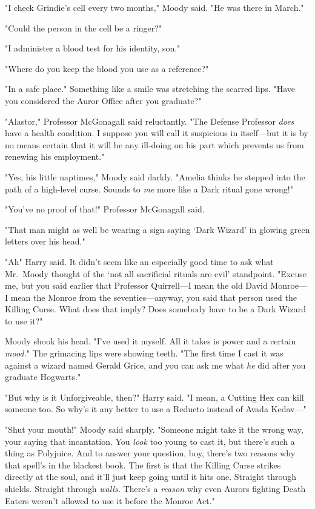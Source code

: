 "I check Grindie's cell every two months," Moody said. "He was there in March."

"Could the person in the cell be a ringer?"

"I administer a blood test for his identity, son."

"Where do you keep the blood you use as a reference?"

"In a safe place." Something like a smile was stretching the scarred lips.
"Have you considered the Auror Office after you graduate?"

"Alastor," Professor McGonagall said reluctantly. "The Defense Professor
\emph{does} have a{\el} health condition. I suppose you will call it
suspicious in itself---but it is by no means certain that it will be any
ill-doing on his part which prevents us from renewing his employment."

"Yes, his little naptimes," Moody said darkly. "Amelia thinks he stepped into
the path of a high-level curse. Sounds to \emph{me} more like a Dark ritual
gone wrong!"

"You've no proof of that!" Professor McGonagall said.

"That man might as well be wearing a sign saying `Dark Wizard' in glowing green
letters over his head."

"Ah{\el}" Harry said. It didn't seem like an especially good time to ask
what Mr.~Moody thought of the `not all sacrificial rituals are evil'
standpoint. "Excuse me, but you said earlier that Professor Quirrell---I mean
the old David Monroe---I mean the Monroe from the seventies---anyway, you said
that person used the Killing Curse. What does that imply? Does somebody have to
be a Dark Wizard to use it?"

Moody shook his head. "I've used it myself. All it takes is power and a certain
\emph{mood.}" The grimacing lips were showing teeth. "The first time I cast it
was against a wizard named Gerald Grice, and you can ask me what \emph{he} did
after you graduate Hogwarts."

"But why is it Unforgiveable, then?" Harry said. "I mean, a Cutting Hex can
kill someone too. So why's it any better to use a Reducto instead of Avada
Kedav---"

"Shut your mouth!" Moody said sharply. "Someone might take it the wrong way,
your saying that incantation. You \emph{look} too young to cast it, but there's
such a thing as Polyjuice. And to answer your question, boy, there's two
reasons why that spell's in the blackest book. The first is that the Killing
Curse strikes directly at the soul, and it'll just keep going until it hits
one. Straight through shields. Straight through \emph{walls.} There's a
\emph{reason} why even Aurors fighting Death Eaters weren't allowed to use it
before the Monroe Act."

